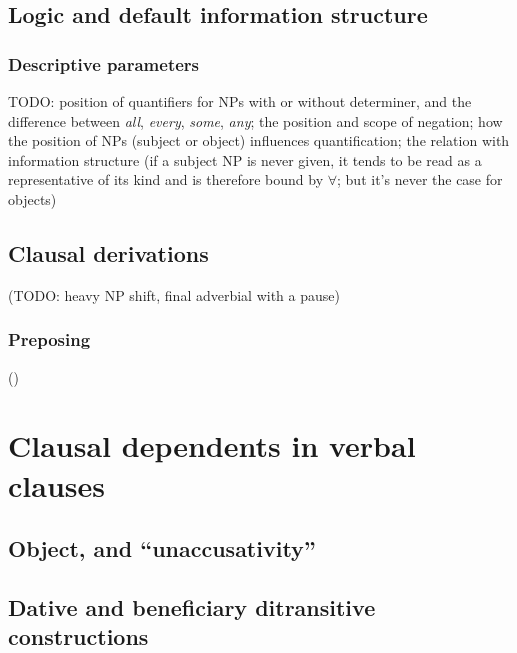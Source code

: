 \documentclass[UTF8, a4paper, oneside, scheme=plain, 12pt]{ctexbook}
\newcommand{\form}[1]{\emph{#1}}
\begin{document}
\subsection{Logic and default information structure}

\subsubsection{Descriptive parameters}

TODO: position of quantifiers for NPs with or without determiner,
and the difference between \form{all}, \form{every}, \form{some}, \form{any};
the position and scope of negation;
how the position of NPs (subject or object) influences quantification;
the relation with information structure
(if a subject NP is never given, 
it tends to be read as a representative of its kind and is therefore bound by $\forall$;
but it's never the case for objects)

\subsection{Clausal derivations}\label{sec:simple-clause.derivation}

(TODO: heavy NP shift, final adverbial with a pause)

\subsubsection{Preposing}\label{sec:simple-clause.derivation.preposing}

()


\section{Clausal dependents in verbal clauses}

 

\subsection{Object, and ``unaccusativity''}



\subsection{Dative and beneficiary ditransitive constructions}
\end{document}
